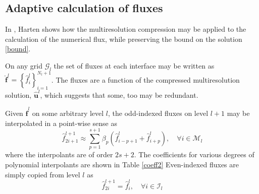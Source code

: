 \documentclass[]{article}
\begin{document}
%

    \subsection{Adaptive calculation of fluxes}

        In \cite{harten1994}, Harten shows how the multiresolution compression
        may be applied to the calculation of the numerical flux, while
        preserving the bound on the solution \ref{bound}.

        On any grid $\bm{\mathcal{G}}_{l}$ the set of fluxes at each interface
        may be written as $\hat{\bm{f}}^{l} = \left\{ \hat{f}^{l}_{i}
        \right\}_{i=1}^{N_{l}+1}$. The fluxes are a function of the compressed
        multiresolution solution, $\hat{\bm{u}}^{l}$, which suggests that some,
        too may be redundant.

        Given $\hat{\bm{f}}^{l}$ on some arbitrary level $l$, the odd-indexed
        fluxes on level $l+1$ may be interpolated in a point-wise sense as
        \begin{equation}
            \hat{f}_{2i+1}^{l+1} \approx \sum_{p=1}^{s+1} \beta_{p} \left(
            \hat{f}^{l}_{i-p+1} + \hat{f}^{l}_{i+p} \right), \quad \forall i \in \bm{\mathcal{M}}_{l}
        \end{equation}
        where the interpolants are of order $2s+2$. The coefficients for
        various degrees of polynomial interpolants are shown in Table \ref{coeff2}
        Even-indexed fluxes are simply copied from level $l$ as
        \begin{equation}
            \hat{f}^{l+1}_{2i} = \hat{f}^{l}_{i}, \quad \forall i \in \bm{\mathcal{I}}_{l}
        \end{equation}
\end{document}
